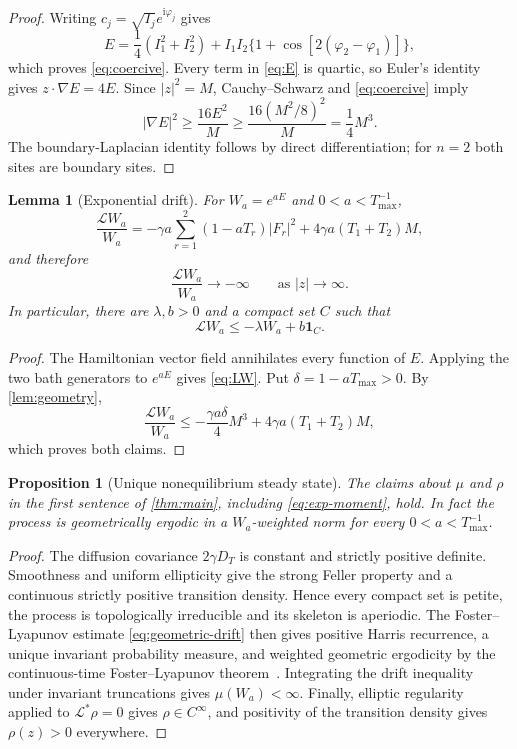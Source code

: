 \documentclass[11pt]{article}
\newtheorem{proposition}[theorem]{Proposition}
\newtheorem{lemma}[theorem]{Lemma}
\theoremstyle{remark}
\newcommand{\cL}{\mathcal L}
\begin{document}
\begin{proof}
Writing $c_j=\sqrt{I_j}e^{\mathrm i\varphi_j}$ gives
\[
 E=\frac14(I_1^2+I_2^2)
 +I_1I_2\{1+\cos[2(\varphi_2-\varphi_1)]\},
\]
which proves \eqref{eq:coercive}.  Every term in \eqref{eq:E} is quartic,
so Euler's identity gives $z\cdot\nabla E=4E$.  Since $|z|^2=M$,
Cauchy--Schwarz and \eqref{eq:coercive} imply
\[
 |\nabla E|^2\ge\frac{16E^2}{M}
 \ge\frac{16(M^2/8)^2}{M}=\frac14M^3.
\]
The boundary-Laplacian identity follows by direct differentiation; for
$n=2$ both sites are boundary sites.
\end{proof}

\begin{lemma}[Exponential drift]\label{lem:drift}
For $W_a=e^{aE}$ and $0<a<T_{\max}^{-1}$,
\begin{equation}\label{eq:LW}
 \frac{\cL W_a}{W_a}
 =-\gamma a\sum_{r=1}^2(1-aT_r)|F_r|^2
 +4\gamma a(T_1+T_2)M,
\end{equation}
and therefore
\begin{equation}\label{eq:LW-infty}
 \frac{\cL W_a}{W_a}\longrightarrow-\infty
 \qquad\text{as }|z|\to\infty.
\end{equation}
In particular, there are $\lambda,b>0$ and a compact set $C$ such that
\begin{equation}\label{eq:geometric-drift}
 \cL W_a\le-\lambda W_a+b\mathbf1_C.
\end{equation}
\end{lemma}

\begin{proof}
The Hamiltonian vector field annihilates every function of $E$.  Applying
the two bath generators to $e^{aE}$ gives \eqref{eq:LW}.  Put
$\delta=1-aT_{\max}>0$.  By \cref{lem:geometry},
\[
 \frac{\cL W_a}{W_a}
 \le-\frac{\gamma a\delta}{4}M^3
 +4\gamma a(T_1+T_2)M,
\]
which proves both claims.
\end{proof}

\begin{proposition}[Unique nonequilibrium steady state]\label{prop:NESS}
The claims about $\mu$ and $\rho$ in the first sentence of
\cref{thm:main}, including \eqref{eq:exp-moment}, hold.  In fact the process
is geometrically ergodic in a $W_a$-weighted norm for every
$0<a<T_{\max}^{-1}$.
\end{proposition}

\begin{proof}
The diffusion covariance $2\gamma D_T$ is constant and strictly positive
definite.  Smoothness and uniform ellipticity give the strong Feller
property and a continuous strictly positive transition density.  Hence every
compact set is petite, the process is topologically irreducible and its
skeleton is aperiodic.  The Foster--Lyapunov estimate
\eqref{eq:geometric-drift} then gives positive Harris recurrence, a unique
invariant probability measure, and weighted geometric ergodicity by the
continuous-time Foster--Lyapunov theorem~\cite{MeynTweedie1993}.  Integrating the drift inequality
under invariant truncations gives $\mu(W_a)<\infty$.  Finally, elliptic
regularity applied to $\cL^*\rho=0$ gives $\rho\in C^\infty$, and positivity
of the transition density gives $\rho(z)>0$ everywhere.
\end{proof}
\end{document}
